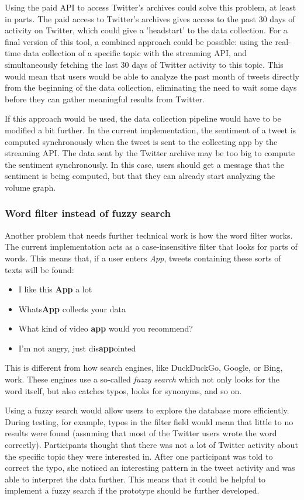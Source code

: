 Using the paid API to access Twitter's archives could solve this problem, at least in parts. The paid access to Twitter's archives gives access to the past 30 days of activity on Twitter, which could give a 'headstart' to the data collection. For a final version of this tool, a combined approach could be possible: using the real-time data collection of a specific topic with the streaming API, and simultaneously fetching the last 30 days of Twitter activity to this topic. This would mean that users would be able to analyze the past month of tweets directly from the beginning of the data collection, eliminating the need to wait some days before they can gather meaningful results from Twitter.

If this approach would be used, the data collection pipeline would have to be modified a bit further. In the current implementation, the sentiment of a tweet is computed synchronously when the tweet is sent to the collecting app by the streaming API. The data sent by the Twitter archive may be too big to compute the sentiment synchronously. In this case, users should get a message that the sentiment is being computed, but that they can already start analyzing the volume graph.

\subsubsection*{Word filter instead of fuzzy search}
Another problem that needs further technical work is how the word filter works. The current implementation acts as a case-insensitive filter that looks for parts of words. This means that, if a user enters \emph{App}, tweets containing these sorts of texts will be found:

\begin{itemize}
    \item I like this \textbf{App} a lot
    \item Whats\textbf{App} collects your data
    \item What kind of video \textbf{app} would you recommend?
    \item I'm not angry, just dis\textbf{app}ointed
\end{itemize}

This is different from how search engines, like DuckDuckGo, Google, or Bing, work. These engines use a so-called \emph{fuzzy search} which not only looks for the word itself, but also catches typos, looks for synonyms, and so on.

Using a fuzzy search would allow users to explore the database more efficiently. During testing, for example, typos in the filter field would mean that little to no results were found (assuming that most of the Twitter users wrote the word correctly). Participants thought that there was not a lot of Twitter activity about the specific topic they were interested in. After one participant was told to correct the typo, she noticed an interesting pattern in the tweet activity and was able to interpret the data further. This means that it could be helpful to implement a fuzzy search if the prototype should be further developed.

